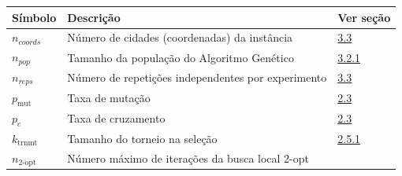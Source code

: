 \begin{longtable}[]{@{}
    >{\raggedright\arraybackslash}p{}
    >{\raggedright\arraybackslash}p{}
    >{\raggedright\arraybackslash}p{}@{}}
  \toprule\noalign{}
  \begin{minipage}[b]{\linewidth}\raggedright
    Símbolo
  \end{minipage} & \begin{minipage}[b]{\linewidth}\raggedright
                     Descrição
                   \end{minipage}             & \begin{minipage}[b]{\linewidth}\raggedright
                                                  Ver seção
                                                \end{minipage}                \\
  \midrule\noalign{}
  \endhead
  \bottomrule\noalign{}
  \endlastfoot
  \(n_{coords}\)                              & Número de cidades (coordenadas) da instância            &
  \hyperref[sec-33-selecao-instancias]{3.3}                                                               \\
  \(n_{pop}\)                                 & Tamanho da população do Algoritmo Genético              &
  \hyperref[sec-321-ga-base]{3.2.1}                                                                       \\
  \(n_{reps}\)                                & Número de repetições independentes por experimento      &
  \hyperref[sec-33-selecao-instancias]{3.3}                                                               \\
  \(p_{\text{mut}}\)                          & Taxa de mutação                                         &
  \hyperref[sec-23-algoritmos-geneticos]{2.3}                                                             \\
  \(p_c\)                                     & Taxa de cruzamento                                      &
  \hyperref[sec-23-algoritmos-geneticos]{2.3}                                                             \\
  \(k_{\text{trnmt}}\)                        & Tamanho do torneio na seleção                           &
  \hyperref[sec-251-ga-2opt]{2.5.1}                                                                       \\
  \(n_{2\text{-opt}}\)                        & Número máximo de iterações da busca local 2-opt         &

\end{longtable}
